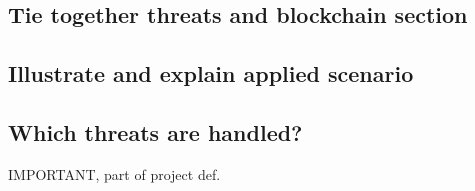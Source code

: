 
\subsection{Tie together threats and blockchain section}

\subsection{Illustrate and explain applied scenario}

\subsection{Which threats are handled?}
IMPORTANT, part of project def.
